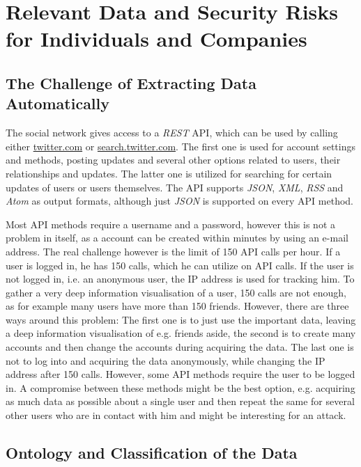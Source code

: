 \section{Relevant Data and Security Risks for Individuals and Companies}
\label{sec:relevant_data}

\subsection{The Challenge of Extracting Data Automatically}

The \Twitter{} social network gives access to a \textit{REST} API, which can be
used by calling either \url{twitter.com} or \url{search.twitter.com}. The first
one is used for account settings and methods, posting updates and several other
options related to users, their relationships and updates. The latter one is
utilized for searching for certain updates of users or users themselves. The
API supports \textit{JSON}, \textit{XML}, \textit{RSS} and \textit{Atom} as
output formats, although just \textit{JSON} is supported on every API method.

Most API methods require a username and a password, however this is not a
problem in itself, as a \Twitter{} account can be created within minutes by
using an e-mail address. The real challenge however is the limit of 150 API
calls per hour. If a user is logged in, he has 150 calls, which he can
utilize on API calls. If the user is not logged in, i.e. an anonymous user, the IP
address is used for tracking him. To gather a very deep information
visualisation of a user, 150 calls are not enough, as for example many users
have more than 150 friends. However, there are three ways around this problem:
The first one is to just use the important data, leaving a deep information
visualisation of e.g. friends aside, the second is to create many accounts and
then change the accounts during acquiring the data. The last one is not to log
into \Twitter{} and acquiring the data anonymously, while changing the IP
address after 150 calls. However, some API methods require the user to be
logged in. A compromise between these methods might be the best option,
e.g. acquiring as much data as possible about a single user and then repeat the
same for several other users who are in contact with him and might be
interesting for an attack.

\subsection{Ontology and Classification of the Data}
\label{ssec:ontology}

